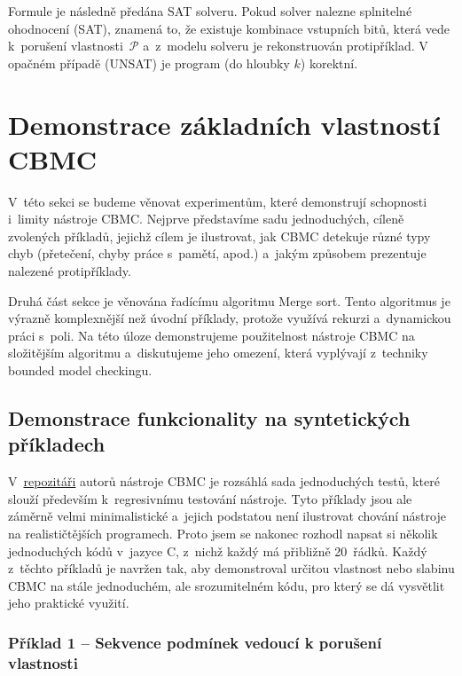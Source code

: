 \documentclass[a4paper, 11pt]{article}
\begin{document}
Formule je následně předána SAT solveru.
Pokud solver nalezne splnitelné ohodnocení (SAT), znamená to, že existuje kombinace vstupních bitů, která vede k~porušení vlastnosti~$\mathcal{P}$ a~z~modelu solveru je rekonstruován protipříklad.
V opačném případě (UNSAT) je program (do hloubky $k$) korektní.

\section{Demonstrace základních vlastností CBMC}\label{sec:CBMC_Demo}

V~této sekci se budeme věnovat experimentům, které demonstrují schopnosti i~limity nástroje CBMC.
Nejprve představíme sadu jednoduchých, cíleně zvolených příkladů, jejichž cílem je ilustrovat, jak CBMC detekuje různé typy chyb (přetečení, chyby práce s~pamětí, apod.) a~jakým způsobem prezentuje nalezené protipříklady.

Druhá část sekce je věnována řadícímu algoritmu Merge sort.
Tento algoritmus je výrazně komplexnější než úvodní příklady, protože využívá rekurzi a~dynamickou práci s~poli.
Na této úloze demonstrujeme použitelnost nástroje CBMC na složitějším algoritmu a~diskutujeme jeho omezení, která vyplývají z~techniky bounded model checkingu.

\subsection{Demonstrace funkcionality na syntetických příkladech}\label{sec:CBMC_Demo_Synthetic}

V~\href{https://github.com/diffblue/cbmc}{repozitáři} autorů nástroje CBMC je rozsáhlá sada jednoduchých testů, které slouží především k~regresivnímu testování nástroje.
Tyto příklady jsou ale záměrně velmi minimalistické a~jejich podstatou není ilustrovat chování nástroje na realističtějších programech.
Proto jsem se nakonec rozhodl napsat si několik jednoduchých kódů v~jazyce C, z~nichž každý má přibližně 20~řádků.
Každý z~těchto příkladů je navržen tak, aby demonstroval určitou vlastnost nebo slabinu CBMC na stále jednoduchém, ale srozumitelném kódu, pro který se dá vysvětlit jeho praktické využití.

\subsubsection{Příklad 1 -- Sekvence podmínek vedoucí k porušení vlastnosti}
\end{document}
